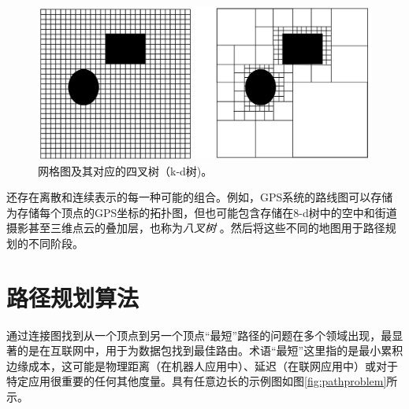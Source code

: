 \begin{figure}
\centering
\includegraphics[width=\textwidth]{figs/gridvskdtree.png}
\caption{网格图及其对应的四叉树（k-d树)。}
\label{fig:gridvskdtree}
\end{figure}



还存在离散和连续表示的每一种可能的组合。例如，GPS系统的路线图可以存储为存储每个顶点的GPS坐标的拓扑图，但也可能包含存储在8-d树中的空中和街道摄影甚至三维点云的叠加层，也称为\emph{八叉树} 。然后将这些不同的地图用于路径规划的不同阶段。



\section{路径规划算法}
通过连接图找到从一个顶点到另一个顶点“最短”路径的问题在多个领域出现，最显著的是在互联网中，用于为数据包找到最佳路由。术语“最短”这里指的是最小累积边缘成本，这可能是物理距离（在机器人应用中）、延迟（在联网应用中）或对于特定应用很重要的任何其他度量。具有任意边长的示例图如图\ref{fig:pathproblem}所示。

